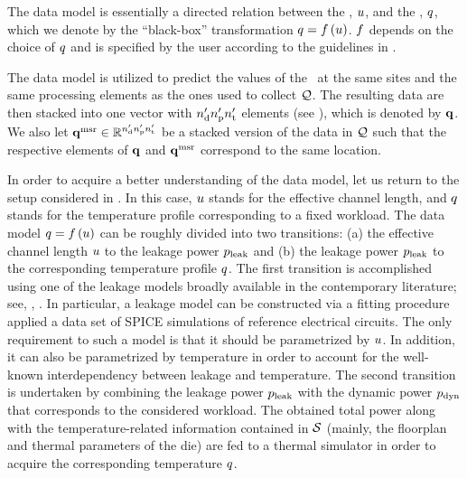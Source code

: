 The data model is essentially a directed relation between the \qoi, $u$, and the \qom, $q$, which we denote by the ``black-box'' transformation $\q = \oBB{\u}$.
$\oBB$ depends on the choice of $q$ and is specified by the user according to the guidelines in .

The data model is utilized to predict the values of the \qom\ at the same sites and the same processing elements as the ones used to collect $\mathcal{Q}$.
The resulting data are then stacked into one vector with ${n_\text{d}'} {n_\text{p}'} {n_\text{t}'}$ elements (see ), which is denoted by $\mathbf{q}$.
We also let $\mathbf{q}^{\text{msr}} \in \mathbb{R}^{{n_\text{d}'} {n_\text{p}'} {n_\text{t}'}}$ be a stacked version of the data in $\mathcal{Q}$ such that the respective elements of $\mathbf{q}$ and $\mathbf{q}^{\text{msr}}$ correspond to the same location.

In order to acquire a better understanding of the data model, let us return to the setup considered in .
In this case, $u$ stands for the effective channel length, and $q$ stands for the temperature profile corresponding to a fixed workload.
The data model $\q = \oBB{\u}$ can be roughly divided into two transitions: (a) the effective channel length $u$ to the leakage power $p_{\text{leak}}$ and (b) the leakage power $p_{\text{leak}}$ to the corresponding temperature profile $q$.
The first transition is accomplished using one of the leakage models broadly available in the contemporary literature; see, \eg, \cite{chandrakasan2001, srivastava2010, juan2012}.
In particular, a leakage model can be constructed via a fitting procedure applied a data set of SPICE simulations of reference electrical circuits.
The only requirement to such a model is that it should be parametrized by $u$.
In addition, it can also be parametrized by temperature in order to account for the well-known interdependency between leakage and temperature.
The second transition is undertaken by combining the leakage power $p_{\text{leak}}$ with the dynamic power $p_{\text{dyn}}$ that corresponds to the considered workload.
The obtained total power along with the temperature-related information contained in $\mathcal{S}$ (mainly, the floorplan and thermal parameters of the die) are fed to a thermal simulator in order to acquire the corresponding temperature $q$.
